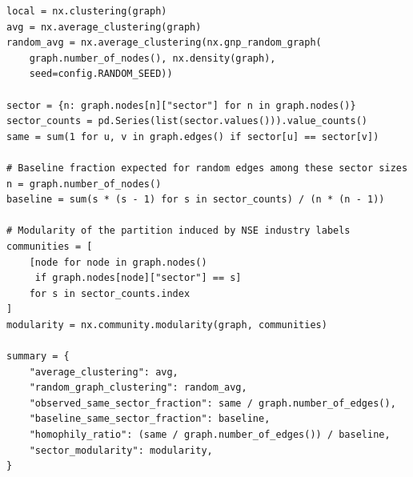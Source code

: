 \begin{lstlisting}[style=python]
local = nx.clustering(graph)
avg = nx.average_clustering(graph)
random_avg = nx.average_clustering(nx.gnp_random_graph(
    graph.number_of_nodes(), nx.density(graph),
    seed=config.RANDOM_SEED))

sector = {n: graph.nodes[n]["sector"] for n in graph.nodes()}
sector_counts = pd.Series(list(sector.values())).value_counts()
same = sum(1 for u, v in graph.edges() if sector[u] == sector[v])

# Baseline fraction expected for random edges among these sector sizes
n = graph.number_of_nodes()
baseline = sum(s * (s - 1) for s in sector_counts) / (n * (n - 1))

# Modularity of the partition induced by NSE industry labels
communities = [
    [node for node in graph.nodes()
     if graph.nodes[node]["sector"] == s]
    for s in sector_counts.index
]
modularity = nx.community.modularity(graph, communities)

summary = {
    "average_clustering": avg,
    "random_graph_clustering": random_avg,
    "observed_same_sector_fraction": same / graph.number_of_edges(),
    "baseline_same_sector_fraction": baseline,
    "homophily_ratio": (same / graph.number_of_edges()) / baseline,
    "sector_modularity": modularity,
}
\end{lstlisting}
